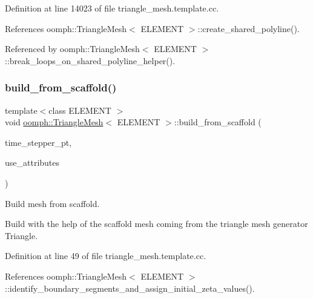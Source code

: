 Definition at line 14023 of file triangle\+\_\+mesh.\+template.\+cc.



References oomph\+::\+Triangle\+Mesh$<$ E\+L\+E\+M\+E\+N\+T $>$\+::create\+\_\+shared\+\_\+polyline().



Referenced by oomph\+::\+Triangle\+Mesh$<$ E\+L\+E\+M\+E\+N\+T $>$\+::break\+\_\+loops\+\_\+on\+\_\+shared\+\_\+polyline\+\_\+helper().

\mbox{\label{classoomph_1_1TriangleMesh_a82ccf74f4e2befe3a6acd458d4e37c35}} 
\subsubsection{\texorpdfstring{build\+\_\+from\+\_\+scaffold()}{build\_from\_scaffold()}}
{\footnotesize\ttfamily template$<$class E\+L\+E\+M\+E\+NT $>$ \\
void \hyperlink{classoomph_1_1TriangleMesh}{oomph\+::\+Triangle\+Mesh}$<$ E\+L\+E\+M\+E\+NT $>$\+::build\+\_\+from\+\_\+scaffold (\begin{DoxyParamCaption}\item[{Time\+Stepper $\ast$}]{time\+\_\+stepper\+\_\+pt,  }\item[{const bool \&}]{use\+\_\+attributes }\end{DoxyParamCaption})\hspace{0.3cm}{\ttfamily [protected]}}



Build mesh from scaffold. 

Build with the help of the scaffold mesh coming from the triangle mesh generator Triangle. 

Definition at line 49 of file triangle\+\_\+mesh.\+template.\+cc.



References oomph\+::\+Triangle\+Mesh$<$ E\+L\+E\+M\+E\+N\+T $>$\+::identify\+\_\+boundary\+\_\+segments\+\_\+and\+\_\+assign\+\_\+initial\+\_\+zeta\+\_\+values().

\mbox{\label{classoomph_1_1TriangleMesh_a1b18773cfdc79964dc7ae58dd11c2862}} 
